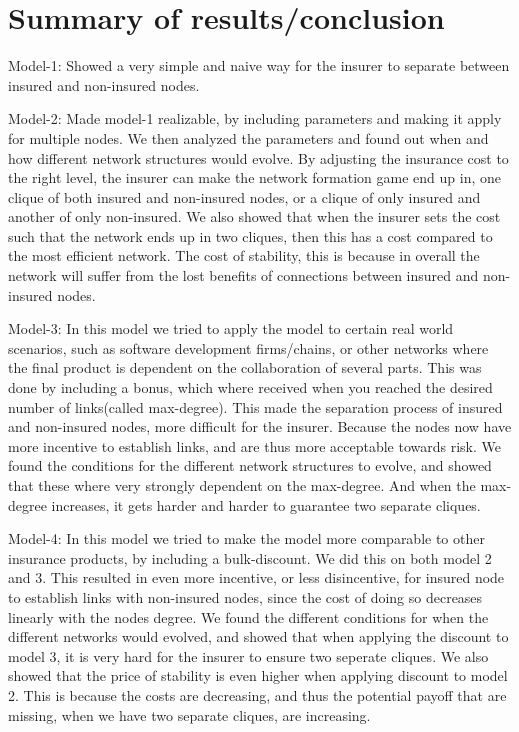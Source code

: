\chapter{Summary of results/conclusion}
Model-1: Showed a very simple and naive way for the insurer to separate between insured and non-insured nodes.

Model-2: Made model-1 realizable, by including parameters and making it apply for multiple nodes. We then analyzed the parameters and found out when and how different network structures would evolve. By adjusting the insurance cost to the right level, the insurer can make the network formation game end up in, one clique of both insured and non-insured nodes, or a clique of only insured and another of only non-insured. 
We also showed that when the insurer sets the cost such that the network ends up in two cliques, then this has a cost compared to the most efficient network. The cost of stability, this is because in overall the network will suffer from the lost benefits of connections between insured and non-insured nodes.

Model-3: In this model we tried to apply the model to certain real world scenarios, such as software development firms/chains, or other networks where the final product is dependent on the collaboration of several parts.
This was done by including a bonus, which where received when you reached the desired number of links(called max-degree). This made the separation process of insured and non-insured nodes, more difficult for the insurer. Because the nodes now have more incentive to establish links, and are thus more acceptable towards risk. We found the conditions for the different network structures to evolve, and showed that these where very strongly dependent on the max-degree. And when the max-degree increases, it gets harder and harder to guarantee two separate cliques. 

Model-4:
In this model we tried to make the model more comparable to other insurance products, by including a bulk-discount. We did this on both model 2 and 3. This resulted in even more incentive, or less disincentive, for insured node to establish links with non-insured nodes, since the cost of doing so decreases linearly with the nodes degree. 
We found the different conditions for when the different networks would evolved, and showed that when applying the discount to model 3, it is very hard for the insurer to ensure two seperate cliques. 
We also showed that the price of stability is even higher when applying discount to model 2. This is because the costs are decreasing, and thus the potential payoff that are missing, when we have two separate cliques, are increasing. 

